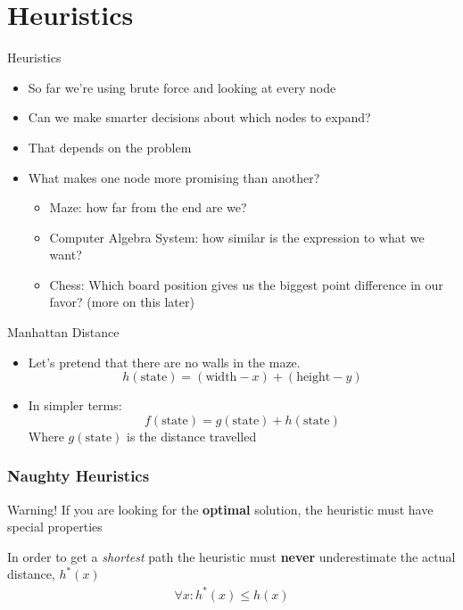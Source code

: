 \documentclass[presentation]{beamer}
\begin{document}
\section{Heuristics}
\begin{frame}{Heuristics}
  \begin{itemize}
  \item<1-> So far we're using brute force and looking at every node
  \item<2-> Can we make smarter 
    decisions about which nodes to
    expand?
  \item<3-> That depends on the problem
  \item<4-> What makes one node more promising than another?
   \begin{itemize}
   \item<5-> Maze: how far from the end are we?
   \item<6-> Computer Algebra System: how similar is the expression to
     what we want?
   \item<7-> Chess: Which board position gives us the biggest point
     difference in our favor?  (more on this later)
   \end{itemize}
  \end{itemize}
\end{frame}
\begin{frame}{Manhattan Distance}
  \begin{itemize}
  \item<1-> Let's pretend that there are no walls in the maze.\\
    \[h(\text{state}) = (\text{width} -x) +  (\text{height} - y)\]
  \item<2-> In simpler terms:\\
    \[f(\text{state}) = g(\text{state}) + h(\text{state})\]
    Where $g(\text{state})$ is the distance travelled
  \end{itemize}
  
\end{frame}
\begin{frame}
  \frametitle{Naughty Heuristics}
  \begin{alertblock} {Warning!}
    If you are looking for the \textbf{optimal} solution, the heuristic must
    have special properties
  \end{alertblock}
  In order to get a \emph{shortest} path the heuristic must \textbf{never}
  underestimate the actual distance, $h^*(x)$
  \begin{align*}
    \forall x :h^*(x) \le  h(x)
  \end{align*}
\end{frame}
\end{document}
